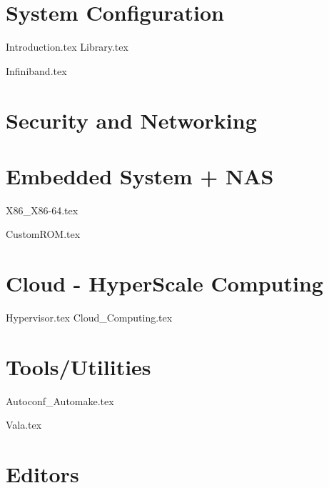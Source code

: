 \documentclass[11pt]{book}
\begin{document}
\frontmatter
\tableofcontents 
%

\mainmatter 

\part{System Configuration}

{Introduction.tex}
{Library.tex}







{Infiniband.tex}


\part{Security and Networking}






\part{Embedded System + NAS}

{X86_X86-64.tex}





{CustomROM.tex}


\part{Cloud - HyperScale Computing}

{Hypervisor.tex}
{Cloud_Computing.tex}


 
\part{Tools/Utilities}


{Autoconf_Automake.tex}



 



{Vala.tex}


\part{Editors}


\end{document}
